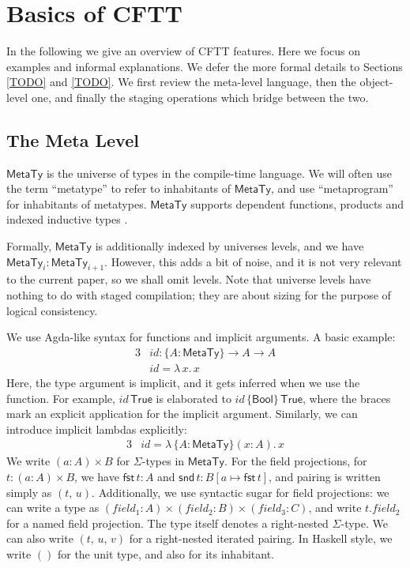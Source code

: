 \documentclass[acmsmall,screen,review,anonymous]{acmart}
\newcommand{\mit}[1]{\mathit{#1}}
\newcommand{\msf}[1]{\mathsf{#1}}
\newcommand{\bs}[1]{\boldsymbol{#1}}
\newcommand{\lam}{\lambda\,}
\newcommand{\Bool}{\msf{Bool}}
\newcommand{\MTy}{\msf{MetaTy}}
\newcommand{\True}{\msf{True}}
\newcommand{\fst}{\msf{fst}}
\newcommand{\snd}{\msf{snd}}
\theoremstyle{remark}
\newcommand{\id}{\mit{id}}
\begin{document}


\section{Basics of CFTT}\label{sec:basics-of-cftt}

In the following we give an overview of CFTT features. Here we focus on examples
and informal explanations. We defer the more formal details to Sections
\ref{TODO} and \ref{TODO}. We first review the meta-level language, then the
object-level one, and finally the staging operations which bridge between the
two.

\subsection{The Meta Level}\label{sec:the-meta-level}

$\bs{\MTy}$ is the universe of types in the compile-time language. We will often
use the term ``metatype'' to refer to inhabitants of $\MTy$, and use
``metaprogram'' for inhabitants of metatypes. $\MTy$ supports dependent
functions, products and indexed inductive types \cite{TODO}.

Formally, $\MTy$ is additionally indexed by universes levels, and we have
$\MTy_i : \MTy_{i+1}$. However, this adds a bit of noise, and it is not very
relevant to the current paper, so we shall omit levels. Note that universe
levels have nothing to do with staged compilation; they are about sizing for the
purpose of logical consistency.


We use Agda-like syntax for functions and implicit arguments. A basic example:
\begin{alignat*}{3}
  &\id : \{A : \MTy\} \to A \to A\\
  &\id = \lam x.\, x
\end{alignat*}
Here, the type argument is implicit, and it gets inferred when we use the
function. For example, $id\,\True$ is elaborated to $id\,\{\Bool\}\,\True$,
where the braces mark an explicit application for the implicit argument.
Similarly, we can introduce implicit lambdas explicitly:
\begin{alignat*}{3}
  &id = \lam \{A : \MTy\}(x : A).\,x
\end{alignat*}
We write $(a : A) \times B$ for $\Sigma$-types in $\MTy$. For the field
projections, for $t : (a : A) \times B$, we have $\fst\,t : A$ and $\snd\,t :
B[a \mapsto \fst\,t]$, and pairing is written simply as $(t,\,u)$. Additionally,
we use syntactic sugar for field projections: we can write a type as $(field_1 :
A) \times (field_2 : B) \times (field_3 : C)$, and write $t.field_2$ for a named
field projection. The type itself denotes a right-nested $\Sigma$-type. We can
also write $(t,\,u,\,v)$ for a right-nested iterated pairing. In Haskell style,
we write $()$ for the unit type, and also for its inhabitant.
\end{document}

